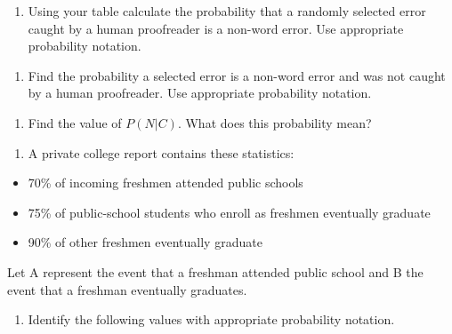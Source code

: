 \documentclass[
]{report}
\providecommand{\tightlist}{%
  \setlength{\itemsep}{0pt}\setlength{\parskip}{0pt}}
\begin{document}
\begin{enumerate}
\def\labelenumi{\alph{enumi}.}
\setcounter{enumi}{2}
\tightlist
\item
  Using your table calculate the probability that a randomly selected error caught by a human proofreader is a non-word error. Use appropriate probability notation.
\end{enumerate}

\vspace{1in}

\begin{enumerate}
\def\labelenumi{\alph{enumi}.}
\setcounter{enumi}{3}
\tightlist
\item
  Find the probability a selected error is a non-word error and was not caught by a human proofreader. Use appropriate probability notation.
\end{enumerate}

\vspace{1in}

\begin{enumerate}
\def\labelenumi{\alph{enumi}.}
\setcounter{enumi}{4}
\tightlist
\item
  Find the value of \(P(N|C)\). What does this probability mean?
\end{enumerate}

\vspace{1in}

\begin{enumerate}
\def\labelenumi{\arabic{enumi}.}
\setcounter{enumi}{1}
\tightlist
\item
  A private college report contains these statistics:
\end{enumerate}

\begin{itemize}
\item
  70\% of incoming freshmen attended public schools
\item
  75\% of public-school students who enroll as freshmen eventually graduate
\item
  90\% of other freshmen eventually graduate
\end{itemize}

Let A represent the event that a freshman attended public school and B the event that a freshman eventually graduates.

\begin{enumerate}
\def\labelenumi{\alph{enumi}.}
\tightlist
\item
  Identify the following values with appropriate probability notation.
\end{enumerate}
\end{document}
